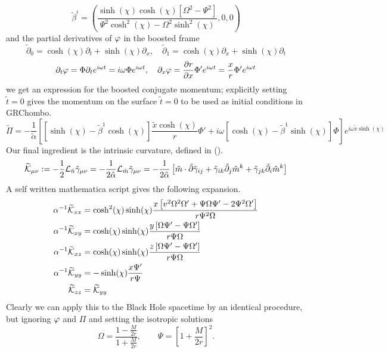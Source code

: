 \begin{equation} \tilde{\beta}^i = \left(\frac{\sinh (\chi)  \cosh (\chi)  \left[\Omega ^2-\Psi ^2\right]}{\Psi ^2 \cosh
   ^2(\chi) -\Omega ^2 \sinh ^2(\chi) },0,0\right)\end{equation}
and the partial derivatives of $\varphi$ in the boosted frame
\begin{equation} \tilde{\partial}_{0} = \cosh(\chi) \partial_t + \sinh(\chi) \partial_x,\quad 
\tilde{\partial}_{1} = \cosh(\chi) \partial_x + \sinh(\chi) \partial_t\end{equation} 
 \begin{equation}\partial_t\varphi =\Phi\partial_te^{i\omega t} =i\omega \Phi e^{i\omega t},\quad
 \partial_x\varphi =\frac{\partial r}{\partial x}\Phi'e^{i\omega t} = \frac{x}{r}\Phi'e^{i\omega t} \end{equation}
we get an expression for the boosted conjugate momentum; explicitly setting $\tilde{t}=0$ gives the momentum on the surface $\tilde{t}=0$ to be used as initial conditions in GRChombo. 
\begin{equation} \widetilde{\Pi} = -\frac{1}{\tilde{\alpha}}\left[  \left[ \sinh(\chi)-\tilde{\beta}^1 \cosh(\chi)\right]\frac{\tilde{x}\cosh(\chi)}{r}\Phi' + i\omega \left[ \cosh(\chi)-\tilde{\beta}^1\sinh(\chi)\right]\Phi\right]e^{i\omega \tilde{x}\sinh(\chi)}\end{equation}
Our final ingredient is the intrinsic curvature, defined in ().
\begin{equation} \widetilde{\mathcal{K}}_{\mu\nu} := -\frac{1}{2}\mathcal{L}_{\tilde{n}}\tilde{\gamma}_{\mu\nu} =-\frac{1}{2\tilde{\alpha}}\mathcal{L}_{\tilde{m}}\tilde{\gamma}_{\mu\nu} = -\frac{1}{2\tilde{\alpha}}\left[ \tilde m \cdot \tilde{\partial}\tilde{\gamma}_{ij} +  \tilde{\gamma}_{ik}\tilde{\partial}_j \tilde{m}^k +\tilde{\gamma}_{jk}\tilde{\partial}_i \tilde{m}^k\right]\end{equation}
A self written mathematica script gives the following expansion.
\begin{align}\alpha^{-1} \widetilde{\mathcal{K}}_{xx} &= \cosh^2(\chi)\sinh(\chi)\frac{x \left[v^2 \Omega^2 \Omega'+\Psi \Omega \Psi'-2 \Psi^2 \Omega'\right]}{r \Psi^2 \Omega}\\
 \alpha^{-1} \widetilde{\mathcal{K}}_{xy} &= \cosh(\chi)\sinh(\chi)\frac{ y \left[\Omega \Psi'- \Psi \Omega'\right]}{r \Psi \Omega }\\
 \alpha^{-1} \widetilde{\mathcal{K}}_{xz} &= \cosh(\chi)\sinh(\chi)\frac{ z \left[\Omega \Psi'- \Psi \Omega'\right]}{r \Psi \Omega }\\
 \alpha^{-1} \widetilde{\mathcal{K}}_{yy} &= -\sinh(\chi)\frac{ x \Psi'}{ r \Psi }\\
\widetilde{\mathcal{K}}_{zz}&=\widetilde{\mathcal{K}}_{yy} \end{align}
Clearly we can apply this to the Black Hole spacetime by an identical procedure, but ignoring $\varphi$ and $\Pi$ and setting the isotropic solutions
\begin{equation} \Omega = \frac{1-\frac{M}{2r}}{1+\frac{M}{2r}}, \quad  \quad \Psi = \left[1+\frac{M}{2r}\right]^2.\end{equation}
 
